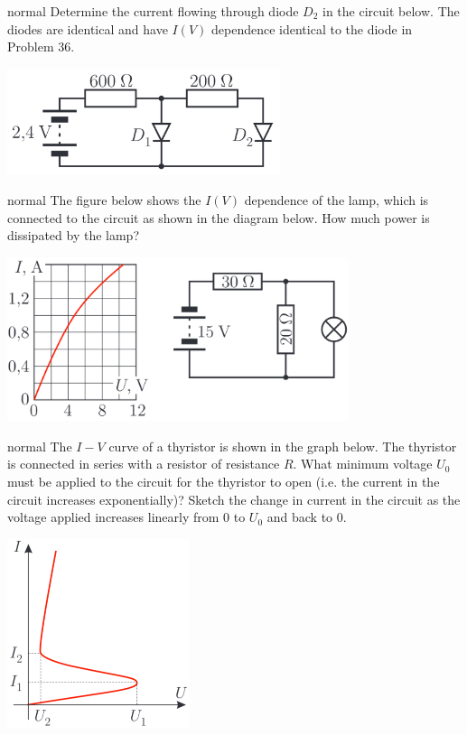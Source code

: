 \hypertarget{P37}{}
\begin{solution}{normal} %
Determine the current flowing through diode $D_2$ in the circuit below. The diodes are identical and have $I(V)$ dependence identical to the diode in Problem 36.
\begin{center}
    \includegraphics[width=0.6\textwidth]{S1 Figures/S1-37.png}
\end{center}
\end{solution}

\hypertarget{P38}{}
\begin{solution}{normal} %
The figure below shows the $I(V)$ dependence of the lamp, which is connected to the circuit as shown in the diagram below. How much power is dissipated by the lamp?
\begin{center}
    \includegraphics[width=0.75\textwidth]{S1 Figures/S1-38.png}
\end{center}
\end{solution}

\hypertarget{P39}{}
\begin{solution}{normal} %
The $I-V$ curve of a thyristor is shown in the graph below. The thyristor is connected in series with a resistor of resistance $R$. What minimum voltage $U_0$ must be applied to the circuit for the thyristor to open (i.e. the current in the circuit increases exponentially)? Sketch the change in current in the circuit as the voltage applied increases linearly from $0$ to $U_0$ and back to $0$.
\begin{center}
    \includegraphics[width=0.4\textwidth]{S1 Figures/S1-39.png}
\end{center}
\end{solution}

